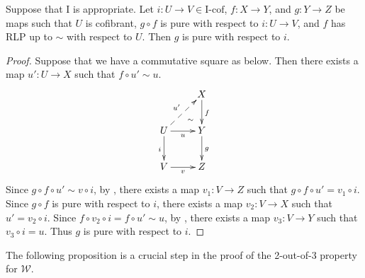 \documentclass{amsart}
\theoremstyle{definition}
\newcommand{\we}{\mathcal{W}}
\newcommand{\I}{\mathrm{I}}
\newcommand{\class}[2]{#1\text{-}\mathrm{#2}}
\newcommand{\Icof}[1][\I]{\class{#1}{cof}}
\begin{document}
\begin{lem}
Suppose that $\I$ is appropriate.
Let $i : U \to V \in \Icof$, $f : X \to Y$, and $g : Y \to Z$ be maps such that $U$ is cofibrant, $g \circ f$
is pure with respect to $i : U \to V$, and $f$ has RLP up to $\sim$ with respect to $U$.
Then $g$ is pure with respect to $i$.
\end{lem}
\begin{proof}
Suppose that we have a commutative square as below.
Then there exists a map $u' : U \to X$ such that $f \circ u' \sim u$.
\[ \xymatrix{   \ar@{}[dr]|(.7){\sim}                & X \ar[d]^f \\
              U \ar@{-->}[ur]^{u'} \ar[d]_i \ar[r]_u & Y \ar[d]^g \\
              V \ar[r]_v                             & Z
            } \]
Since $g \circ f \circ u' \sim v \circ i$, by , there
exists a map $v_1 : V \to Z$ such that $g \circ f \circ u' = v_1 \circ i$.
Since $g \circ f$ is pure with respect to $i$, there exists a map $v_2 : V \to X$ such that $u' = v_2 \circ i$.
Since $f \circ v_2 \circ i = f \circ u' \sim u$, by ,
there exists a map $v_3 : V \to Y$ such that $v_3 \circ i = u$.
Thus $g$ is pure with respect to $i$.
\end{proof}

The following proposition is a crucial step in the proof of the 2-out-of-3 property for $\we$.
\end{document}
